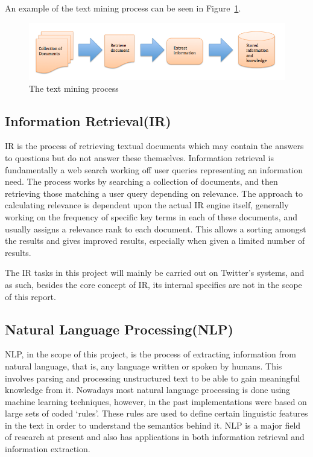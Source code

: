 An example of the text mining process can be seen in Figure~\ref{fig:tm}.
\begin{figure}[b]
\begin{center}
\includegraphics[width=15cm]{tm}
\end{center}
\caption{The text mining process\cite{Gupta_Lehal_2009}}
\label{fig:tm}
\end{figure}


\subsection[Information Retrieval]{Information Retrieval(IR)}
IR is the process of retrieving textual documents which may contain the answers to questions but do not answer these themselves\cite{hotho-etal-ldv-2005}. Information retrieval is fundamentally a web search working off user queries representing an information need. The process works by searching a collection of documents, and then retrieving those matching a user query depending on relevance. The approach to calculating relevance is dependent upon the actual IR engine itself, generally working on the frequency of specific key terms in each of these documents, and usually assigns a relevance rank to each document. This allows a sorting amongst the results and gives improved results, especially when given a limited number of results.

The IR tasks in this project will mainly be carried out on Twitter's systems, and as such, besides the core concept of IR, its internal specifics are not in the scope of this report.

\subsection[Natural Language Processing]{Natural Language Processing(NLP)}
NLP, in the scope of this project, is the process of extracting information from natural language\cite{Healey98}, that is, any language written or spoken by humans. This involves parsing and processing unstructured text to be able to gain meaningful knowledge from it. Nowadays most natural language processing is done using machine learning techniques, however, in the past implementations were based on large sets of coded `rules'. These rules are used to define certain linguistic features in the text in order to understand the semantics behind it. NLP is a major field of research at present and also has applications in both information retrieval and information extraction.

